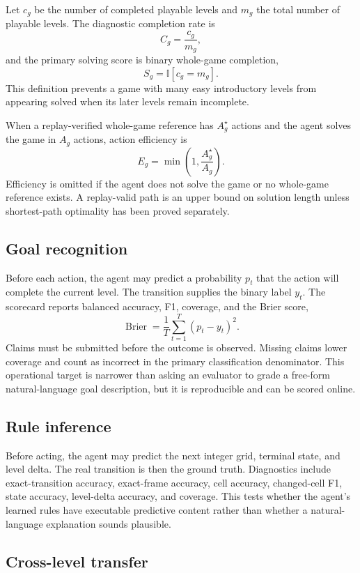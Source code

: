 \documentclass[sigconf,nonacm]{acmart}
\begin{document}
Let \(c_g\) be the number of completed playable levels and \(m_g\) the total
number of playable levels. The diagnostic completion rate is
\[
C_g=\frac{c_g}{m_g},
\]
and the primary solving score is binary whole-game completion,
\[
S_g=\mathbb{I}[c_g=m_g].
\]
This definition prevents a game with many easy introductory levels from
appearing solved when its later levels remain incomplete.

When a replay-verified whole-game reference has \(A_g^\star\) actions and the
agent solves the game in \(A_g\) actions, action efficiency is
\[
E_g=\min\left(1,\frac{A_g^\star}{A_g}\right).
\]
Efficiency is omitted if the agent does not solve the game or no whole-game
reference exists. A replay-valid path is an upper bound on solution length
unless shortest-path optimality has been proved separately.

\subsection{Goal recognition}

Before each action, the agent may predict a probability \(p_t\) that the action
will complete the current level. The transition supplies the binary label
\(y_t\). The scorecard reports balanced accuracy, F1, coverage, and the Brier
score,
\[
\operatorname{Brier}=\frac{1}{T}\sum_{t=1}^{T}(p_t-y_t)^2.
\]
Claims must be submitted before the outcome is observed. Missing claims lower
coverage and count as incorrect in the primary classification denominator.
This operational target is narrower than asking an evaluator to grade a
free-form natural-language goal description, but it is reproducible and can be
scored online.

\subsection{Rule inference}

Before acting, the agent may predict the next integer grid, terminal state, and
level delta. The real transition is then the ground truth. Diagnostics include
exact-transition accuracy, exact-frame accuracy, cell accuracy, changed-cell
F1, state accuracy, level-delta accuracy, and coverage. This tests whether the
agent's learned rules have executable predictive content rather than whether a
natural-language explanation sounds plausible.

\subsection{Cross-level transfer}
\end{document}

